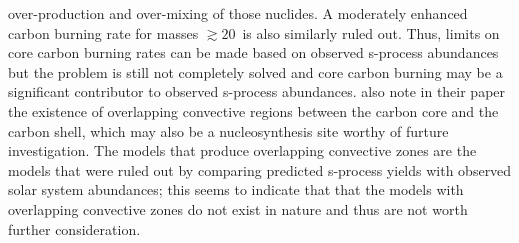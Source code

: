 over-production and over-mixing of those nuclides.  A moderately enhanced carbon
burning rate for masses $\gtrsim 20$\Msol\ is also similarly ruled
out.  Thus, limits on core carbon burning rates can be made based on
observed s-process abundances but the problem is still not completely
solved and core carbon burning may be a significant contributor to
observed s-process abundances.  \cite{bennettetal2012} also note in 
their paper the
existence of overlapping convective regions between the carbon core
and the carbon shell, which may also be a nucleosynthesis site worthy
of furture investigation. The models that produce overlapping
convective zones are the models that were ruled out by comparing
predicted s-process yields with observed solar system abundances; this
seems to indicate that that the models with overlapping convective
zones do not exist in nature and thus are not worth further
consideration.


